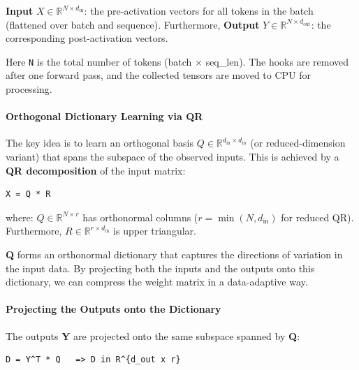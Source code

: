 \textbf{Input} $X \in \mathbb{R}^{N \times d_{\text{in}}}$: the pre-activation vectors for all tokens in the batch (flattened over batch and sequence). Furthermore, \textbf{Output} $Y \in \mathbb{R}^{N \times d_{\text{out}}}$: the corresponding post-activation vectors.


Here \texttt{N} is the total number of tokens (batch $\times$ seq\_len). The hooks are removed after one forward pass, and the collected tensors are moved to CPU for processing.

\paragraph{Orthogonal Dictionary Learning via QR}

The key idea is to learn an orthogonal basis $Q \in \mathbb{R}^{d_{\text{in}} \times d_{\text{in}}}$ (or reduced-dimension variant) that spans the subspace of the observed inputs. This is achieved by a \textbf{QR decomposition} of the input matrix:

\vspace{0.5em}
\begin{mdframed}[backgroundcolor=codebg, linecolor=codeframe, linewidth=1pt, roundcorner=4pt, innerleftmargin=2pt, innerrightmargin=5pt, innertopmargin=5pt, innerbottommargin=5pt]
\begin{lstlisting}
X = Q * R
\end{lstlisting}
\end{mdframed}
\vspace{0.5em}

where:
$Q \in \mathbb{R}^{N \times r}$ has orthonormal columns ($r = \min(N, d_{\text{in}})$ for reduced QR). Furthermore, $R \in \mathbb{R}^{r \times d_{\text{in}}}$ is upper triangular.


\textbf{Q} forms an orthonormal dictionary that captures the directions of variation in the input data. By projecting both the inputs and the outputs onto this dictionary, we can compress the weight matrix in a data-adaptive way.

\paragraph{Projecting the Outputs onto the Dictionary}

The outputs \textbf{Y} are projected onto the same subspace spanned by \textbf{Q}:

\vspace{0.5em}
\begin{mdframed}[backgroundcolor=codebg, linecolor=codeframe, linewidth=1pt, roundcorner=4pt, innerleftmargin=2pt, innerrightmargin=5pt, innertopmargin=5pt, innerbottommargin=5pt]
\begin{lstlisting}
D = Y^T * Q   => D in R^{d_out x r}
\end{lstlisting}
\end{mdframed}
\vspace{0.5em}

